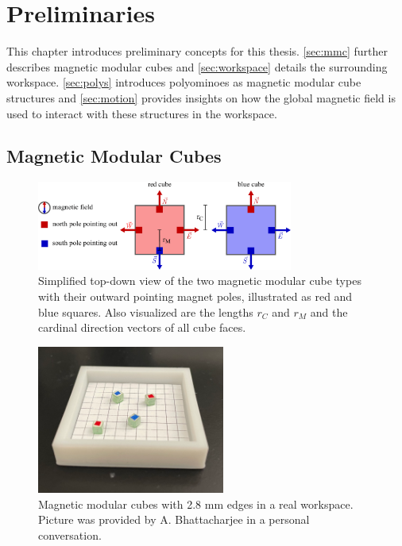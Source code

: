 \chapter{Preliminaries}
\label{chap:prelim}

This chapter introduces preliminary concepts for this thesis.
\autoref{sec:mmc} further describes magnetic modular cubes and \autoref{sec:workspace} details the surrounding workspace.
\autoref{sec:polys} introduces polyominoes as magnetic modular cube structures and \autoref{sec:motion} provides insights on how the global magnetic field is used to interact with these structures in the workspace.

\section{Magnetic Modular Cubes}
\label{sec:mmc}

\begin{figure}
	\centering
	\includegraphics[width=0.75\textwidth]{figures/magnetic_cubes.pdf}
	\caption[Top-down view of magnetic modular cubes]{Simplified top-down view of the two magnetic modular cube types with their outward pointing magnet poles, illustrated as red and blue squares. Also visualized are the lengths $r_C$ and $r_M$ and the cardinal direction vectors of all cube faces.}
	\label{fig:magnetic_cubes}
\end{figure}

\begin{figure}
	\centering
	\includegraphics[width=0.55\textwidth]{figures/real_mmcs2.png}
	\caption[Picture of magnetic modular cubes in a real workspace]{Magnetic modular cubes with 2.8 mm edges in a real workspace. Picture was provided by A. Bhattacharjee in a personal conversation.}
	\label{fig:real_mmcs}
\end{figure}


